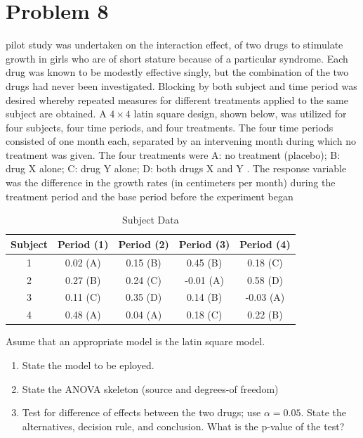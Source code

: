\documentclass{article}
\begin{document}
\section{Problem 8}
pilot study was undertaken on the interaction effect, of two drugs to stimulate growth in girls
who are of short stature because of a particular syndrome. Each drug was known to be modestly
effective singly, but the combination of the two drugs had never been investigated. Blocking by both
subject and time period was desired whereby repeated measures for different treatments applied
to the same subject are obtained. A $4 \times 4$ latin square design, shown below, was utilized for four
subjects, four time periods, and four treatments. The four time periods consisted of one month
each, separated by an intervening month during which no treatment was given. The four treatments
were A: no treatment (placebo); B: drug X alone; C: drug Y alone; D: both drugs X and Y .
The response variable was the difference in the growth rates (in centimeters per month) during the
treatment period and the base period before the experiment began

\begin{table}[!ht]
	\centering
	\caption{Subject Data}
	\begin{tabular}{c c c c c}
		\hline
		\textbf{Subject} & \textbf{Period (1)} & \textbf{Period (2)} & \textbf{Period (3)} & \textbf{Period (4)} \\
		\hline
		1                & 0.02 (A)            & 0.15 (B)            & 0.45 (B)            & 0.18 (C)            \\
		2                & 0.27 (B)            & 0.24 (C)            & -0.01 (A)           & 0.58 (D)            \\
		3                & 0.11 (C)            & 0.35 (D)            & 0.14 (B)            & -0.03 (A)           \\
		4                & 0.48 (A)            & 0.04 (A)            & 0.18 (C)            & 0.22 (B)            \\
		\hline
	\end{tabular}
\end{table}
Asume that an appropriate model is the latin square model.
\begin{enumerate}
	\item State the model to be eployed.
	\item State the ANOVA skeleton (source and degrees-of freedom)
	\item Test for difference of effects between the two drugs; use $\alpha =0.05$. State the alternatives,
	      decision rule, and conclusion. What is the p-value of the test?
\end{enumerate}
\end{document}
